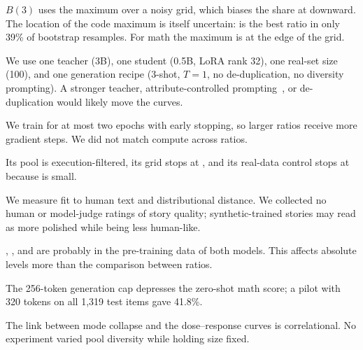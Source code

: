  $B(3)$ uses the maximum over a noisy grid, which biases the share at  downward. The location of the code maximum is itself uncertain:  is the best ratio in only 39\% of bootstrap resamples. For math the maximum is at the edge of the grid.

 We use one teacher (3B), one student (0.5B, LoRA rank 32), one real-set size (100), and one generation recipe (3-shot, $T = 1$, no de-duplication, no diversity prompting). A stronger teacher, attribute-controlled prompting~\citep{yu2023attributed}, or de-duplication would likely move the curves.

 We train for at most two epochs with early stopping, so larger ratios receive more gradient steps. We did not match compute across ratios.

 Its pool is execution-filtered, its grid stops at , and its real-data control stops at  because \mbpp is small.

 We measure fit to human text and distributional distance. We collected no human or model-judge ratings of story quality; synthetic-trained stories may read as more polished while being less human-like.

 \mbpp, \gsm, and \roc are probably in the pre-training data of both models. This affects absolute levels more than the comparison between ratios.

 The 256-token generation cap depresses the zero-shot math score; a pilot with 320 tokens on all 1,319 test items gave 41.8\%.

 The link between mode collapse and the dose--response curves is correlational. No experiment varied pool diversity while holding size fixed.
